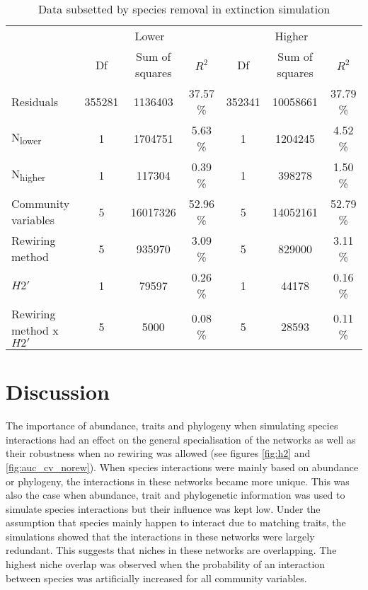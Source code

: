 \documentclass[12pt,a4paper]{article}
\begin{document}
\begin{table}[H]
\begin{subtable}{\linewidth}
\caption{Data subsetted by species removal in extinction simulation}
\label{tab:anova_lo_hi}
\begin{tabularx}{\linewidth}{@{} X *6{c} @{}}
\toprule
  & \multicolumn{3}{c}{Lower} & \multicolumn{3}{c}{Higher} \\ \cmidrule(l){2-4} \cmidrule(l){5-7} 
  						& Df 	& Sum of squares	& $R^2$ 		& Df 	& Sum of squares 	& $R^2$  \\ \midrule
Residuals 				& 355281	& 1136403 		& 37.57 \% 	& 352341	& 10058661 			& 37.79 \%\\ 
N\textsubscript{lower} 	& 1 		& 1704751 		& 5.63 \% 	& 1 		& 1204245 			& 4.52 \%\\
N\textsubscript{higher} 	& 1 		& 117304 		& 0.39 \% 	& 1 		& 398278 			& 1.50 \%\\
Community variables 		& 5 		& 16017326 		& 52.96 \% 	& 5 		& 14052161 			& 52.79 \%\\
Rewiring method 			& 5 		& 935970			& 3.09 \% 	& 5 		& 829000				& 3.11 \%\\ 
$H2'$ 					& 1 		& 79597 			& 0.26 \% 	& 1 		& 44178 				& 0.16 \%\\
Rewiring method x $H2'$ 	& 5 		& 5000 			& 0.08 \% 	& 5 		& 28593				& 0.11 \%\\ \bottomrule
\end{tabularx}
\end{subtable}
\medskip
\end{table}


	\section{Discussion}

The importance of abundance, traits and phylogeny when simulating species interactions had an effect on the general specialisation of the networks as well as their robustness when no rewiring was allowed (see figures \ref{fig:h2} and \ref{fig:auc_cv_norew}). When species interactions were mainly based on abundance or phylogeny, the interactions in these networks became more unique. This was also the case when abundance, trait and phylogenetic information was used to simulate species interactions but their influence was kept low. Under the assumption that species mainly happen to interact due to matching traits, the simulations showed that the interactions in these networks were largely redundant. This suggests that niches in these networks are overlapping. The highest niche overlap was observed when the probability of an interaction between species was artificially increased for all community variables.\paragraph{}
\end{document}
